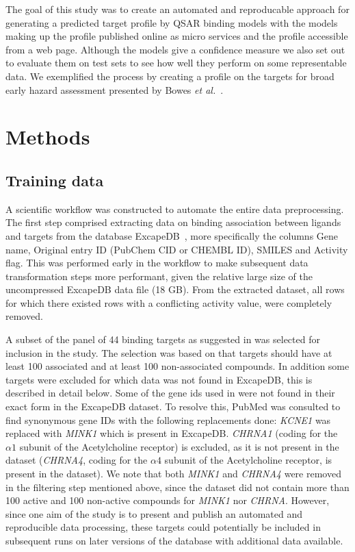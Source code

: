 \documentclass[10pt,article]{memoir}
\begin{document}
The goal of this study was to create an automated and reproducable approach for
generating a predicted target profile by QSAR binding models with the models
making up the profile published online as micro services and the profile
accessible from a web page. Although the models give a confidence measure we
also set out to evaluate them on test sets to see how well they perform on some
representable data. We exemplified the process by creating a profile on the
targets for broad early hazard assessment presented by Bowes \textit{et
al.}~\cite{Bowes2012}.

\section*{Methods}

\subsection{Training data}

A scientific workflow was constructed to automate the entire data preprocessing.
The first step comprised extracting data on binding association between ligands and targets from the database ExcapeDB~\cite{Sun2017}, more specifically the columns Gene name, Original entry ID (PubChem CID or CHEMBL ID), SMILES and Activity flag. This was performed early in the workflow to make subsequent data transformation steps more performant, given the relative large size of the
uncompressed ExcapeDB data file (18 GB).
%
From the extracted dataset, all rows for which there existed rows with a conflicting
activity value, were completely removed.

A subset of the panel of 44 binding targets as suggested in \cite{Bowes2012}
was selected for inclusion in the study. The selection was based on that targets
should have at least 100 associated and at least 100 non-associated compounds. 
In addition some targets were excluded for which data was not found in ExcapeDB, this is described in detail below.
%
Some of the gene ids used in \cite{Bowes2012} were not found in their exact
form in the ExcapeDB dataset. To resolve this, PubMed was consulted to find
synonymous gene IDs with the following replacements done:
%
\textit{KCNE1} was replaced with \textit{MINK1} which is present in ExcapeDB.
\textit{CHRNA1} (coding for the $\alpha1$ subunit of the Acetylcholine
receptor) is excluded, as it is not present in the dataset (\textit{CHRNA4},
coding for the $\alpha4$ subunit of the Acetylcholine receptor, is present in
the dataset). We note that both \textit{MINK1} and \textit{CHRNA4} were removed in the filtering
step mentioned above, since the dataset did not contain more than 100 active
and 100 non-active compounds for \textit{MINK1} nor \textit{CHRNA}. 
However, since one aim of the study is to present and publish an automated and
reproducible data processing, these targets could potentially be included in
subsequent runs on later versions of the database with additional data
available.
\end{document}
